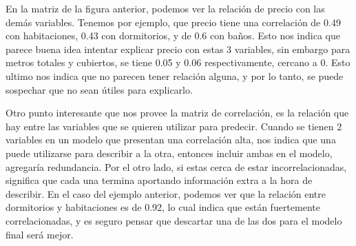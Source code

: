     En la matriz de la figura anterior, podemos ver la relación de precio con las demás variables. Tenemos por ejemplo, que precio tiene una correlación de 0.49 con habitaciones, 0.43 con dormitorios, y de 0.6 con baños. Esto nos indica que parece buena idea intentar explicar precio con estas 3 variables, sin embargo para metros totales y cubiertos, se tiene 0.05 y 0.06 respectivamente, cercano a 0. Esto ultimo nos indica que no parecen tener relación alguna, y por lo tanto, se puede sospechar que no sean útiles para explicarlo.
    
    Otro punto interesante que nos provee la matriz de correlación, es la relación que hay entre las variables que se quieren utilizar para predecir. Cuando se tienen 2 variables en un modelo que presentan una correlación alta, nos indica que una puede utilizarse para describir a la otra, entonces incluir ambas en el modelo, agregaría redundancia. Por el otro lado, si estas cerca de estar incorrelacionadas, significa que cada una termina aportando información extra a la hora de describir. En el caso del ejemplo anterior, podemos ver que la relación entre dormitorios y habitaciones es de 0.92, lo cual indica que están fuertemente correlacionadas, y es seguro pensar que descartar una de las dos para el modelo final será mejor.
    
    